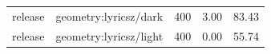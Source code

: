 \begin{longtable}{l>{\raggedright\arraybackslash}p{.42\linewidth}rrr}
release & %
geometry:lyricsz/dark & %
400 & %
3.00 & %
83.43 \\ %

release & %
geometry:lyricsz/light & %
400 & %
0.00 & %
55.74 \\ %


\end{longtable}

